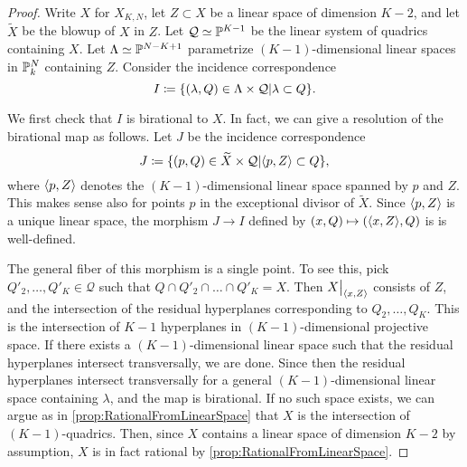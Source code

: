 \begin{proof}
  Write $X$ for $X_{K,N}$, let $Z \subset X$ be a linear space of dimension $K-2$, and let $\widetilde{X}$ be the blowup of $X$ in $Z$.  Let $\mathcal{Q} \simeq \P^{K-1}$ be the linear system of quadrics containing $X$. Let $\Lambda \simeq \P^{N-K+1}$ parametrize $(K-1)$-dimensional linear spaces in $\P_k^N$ containing $Z$. Consider the incidence correspondence
\[ I \coloneqq \set{(\lambda,Q) \in \Lambda \times \mathcal{Q} \vert \lambda \subset Q}. \]

We first check that $I$ is birational to $X$. In fact, we can give a resolution of the birational map as follows. Let $J$ be the incidence correspondence
\[ J \coloneqq \set{(p,Q) \in \widetilde{X} \times \mathcal{Q} \vert \ip{p,Z} \subset Q}, \]
where $\ip{p,Z}$ denotes the $(K-1)$-dimensional linear space spanned by $p$ and $Z$. This makes sense also for points $p$ in the exceptional divisor of $\widetilde{X}$. Since $\ip{p,Z}$ is a unique linear space, the morphism $J \to I$ defined by $(x,Q) \mapsto (\ip{x,Z},Q)$ is is well-defined.

The general fiber of this morphism is a single point. To see this, pick $Q'_2,\dots,Q'_K \in \mathcal{Q}$ such that $Q\cap Q'_2\cap \dots \cap Q'_K = X$. Then $\restr{X}{\ip{x,Z}}$ consists of $Z$, and the intersection of the residual hyperplanes corresponding to $Q_2,\dots,Q_{K}$. This is the intersection of $K-1$ hyperplanes in $(K-1)$-dimensional projective space. If there exists a $(K-1)$-dimensional linear space such that the residual hyperplanes intersect transversally, we are done. Since then the residual hyperplanes intersect transversally for a general $(K-1)$-dimensional linear space containing $\lambda$, and the map is birational. If no such space exists, we can argue as in \cref{prop:RationalFromLinearSpace} that $X$ is the intersection of $(K-1)$-quadrics. Then, since $X$ contains a linear space of dimension $K-2$ by assumption, $X$ is in fact rational by \cref{prop:RationalFromLinearSpace}.


\end{proof}
